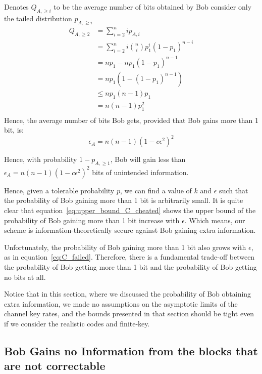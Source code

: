 \documentclass[%
 reprint,
superscriptaddress,
 amsmath,amssymb,
 aps,
]{revtex4-2}
\begin{document}
Denotes $Q_{A, \ge i}$ to be the average number of bits obtained by Bob consider only the tailed distribution $p_{A, \ge i}$
\begin{equation}
    \begin{split}
    Q_{A, \ge2}
    &= \sum_{i=2}^n ip_{A, i}\\
    &=\sum_{i=2}^ni\binom{n}{i}p_1^i(1-p_1)^{n-i}\\
    &=np_1-np_1(1-p_1)^{n-1}\\
    &=np_1(1-(1-p_1)^{n-1})\\
    &\le np_1(n-1)p_1\\
    &=n(n-1)p_1^2\\
    \end{split}
\end{equation}
Hence, the average number of bits Bob gets, provided that Bob gains more than 1 bit, is:
\begin{equation}
    \epsilon_A = n(n-1)(1-c\epsilon^2)^2
\end{equation}

Hence, with probability $1- p_{A, \ge 1}$, Bob will gain less than $\epsilon_A=n(n-1)(1-c\epsilon^2)^2$ bits of unintended information.

Hence, given a tolerable probability $p$, we can find a value of $k$ and $\epsilon$ such that the probability of Bob gaining more than 1 bit is arbitrarily small. It is quite clear that equation~\ref{eq:upper_bound_C_cheated} shows the upper bound of the probability of Bob gaining more than 1 bit increase with $\epsilon$. Which means, our scheme is information-theoretically secure against Bob gaining extra information.

Unfortunately, the probability of Bob gaining more than 1 bit also grows with $\epsilon$, as in equation~\ref{eq:C_failed}. Therefore, there is a fundamental trade-off between the probability of Bob getting more than 1 bit and the probability of Bob getting no bits at all.

Notice that in this section, where we discussed the probability of Bob obtaining extra information, we made no assumptions on the asymptotic limits of the channel key rates, and the bounds presented in that section should be tight even if we consider the realistic codes and finite-key.

\subsection{Bob Gains no Information from the blocks that are not correctable}
\end{document}
